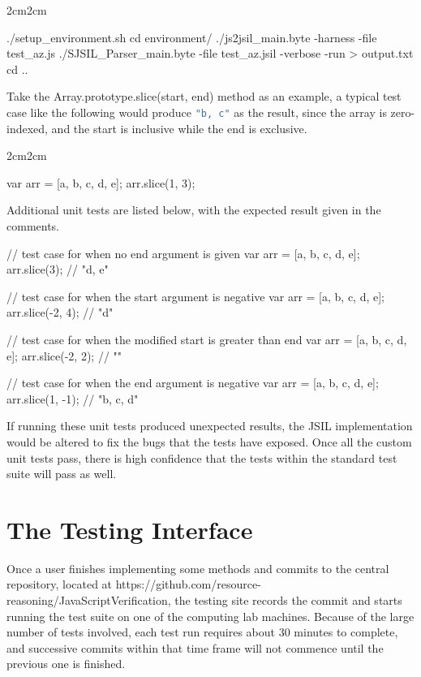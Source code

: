 \documentclass[a4paper,11pt,twoside]{report}
\def\jsinline{\lstinline[language=JavaScript, basicstyle=\small]}%\end{lstlisting}
\begin{document}
\begin{adjustwidth}{2cm}{2cm}
\begin{lstjs}
./setup_environment.sh
cd environment/
./js2jsil_main.byte -harness -file test_az.js
./SJSIL_Parser_main.byte -file test_az.jsil -verbose -run > output.txt
cd ..
\end{lstjs}
\end{adjustwidth}

Take the Array.prototype.slice(start, end) method as an example, a typical test case like the following would produce \jsinline|"b, c"| as the result, since the array is zero-indexed, and the start is inclusive while the end is exclusive.
\begin{adjustwidth}{2cm}{2cm}
\begin{lstjs}
var arr = [a, b, c, d, e];
arr.slice(1, 3);
\end{lstjs}
\end{adjustwidth}

Additional unit tests are listed below, with the expected result given in the comments.
\begin{adjustwidth}{2cm}{2cm}
\begin{lstjs}
// test case for when no end argument is given
var arr = [a, b, c, d, e];
arr.slice(3); 
// "d, e"

// test case for when the start argument is negative
var arr = [a, b, c, d, e];
arr.slice(-2, 4); 
// "d"

// test case for when the modified start is greater than end
var arr = [a, b, c, d, e];
arr.slice(-2, 2); 
// ""

// test case for when the end argument is negative
var arr = [a, b, c, d, e];
arr.slice(1, -1); 
// "b, c, d"
\end{lstjs}
\end{adjustwidth}

If running these unit tests produced unexpected results, the JSIL implementation would be altered to fix the bugs that the tests have exposed. Once all the custom unit tests pass, there is high confidence that the tests within the standard test suite will pass as well.

\section{The Testing Interface}
Once a user finishes implementing some methods and commits to the central repository, located at https://github.com/resource-reasoning/JavaScriptVerification, the testing site records the commit and starts running the test suite on one of the computing lab machines. Because of the large number of tests involved, each test run requires about 30 minutes to complete, and successive commits within that time frame will not commence until the previous one is finished. 
\end{document}
